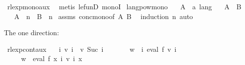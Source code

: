 \begin{isabellebody}
\ rlexp{\isacharunderscore}{\kern0pt}mono{\isacharunderscore}{\kern0pt}aux\ \isamarkupfalse%
\ {\isacharparenleft}{\kern0pt}metis\ le{\isacharunderscore}{\kern0pt}funD\ monoI{\isacharparenright}{\kern0pt}%
\endisatagproof
{\isafoldproof}%
%
\isadelimproof
%
\endisadelimproof
%
\isadelimdocument
%
\endisadelimdocument
%
\isatagdocument
%
\isamarkuptrue%
%
\endisatagdocument
{\isafolddocument}%
%
\isadelimdocument
%
\endisadelimdocument
{}\isamarkupfalse%
\ langpow{\isacharunderscore}{\kern0pt}mono{\isacharcolon}{\kern0pt}\isanewline
\ \ \ A\ {\isacharcolon}{\kern0pt}{\isacharcolon}{\kern0pt}\ {\isachardoublequoteopen}{\isacharprime}{\kern0pt}a\ lang{\isachardoublequoteclose}\isanewline
\ \ \ {\isachardoublequoteopen}A\ {\isasymsubseteq}\ B{\isachardoublequoteclose}\isanewline
\ \ \ {\isachardoublequoteopen}A\ {\isacharcircum}{\kern0pt}{\isacharcircum}{\kern0pt}\ n\ {\isasymsubseteq}\ B\ {\isacharcircum}{\kern0pt}{\isacharcircum}{\kern0pt}\ n{\isachardoublequoteclose}\isanewline
%
\isadelimproof
%
\endisadelimproof
%
\isatagproof
{}\isamarkupfalse%
\ assms\ conc{\isacharunderscore}{\kern0pt}mono{\isacharbrackleft}{\kern0pt}of\ A\ B{\isacharbrackright}{\kern0pt}\ \isamarkupfalse%
\ {\isacharparenleft}{\kern0pt}induction\ n{\isacharparenright}{\kern0pt}\ auto%
\endisatagproof
{\isafoldproof}%
%
\isadelimproof
%
\endisadelimproof
%
\begin{isamarkuptext}%
The one direction:%
\end{isamarkuptext}\isamarkuptrue%
\isamarkupfalse%
\ rlexp{\isacharunderscore}{\kern0pt}cont{\isacharunderscore}{\kern0pt}aux{}{\isacharcolon}{\kern0pt}\isanewline
\ \ \ {\isachardoublequoteopen}{\isasymforall}i{\isachardot}{\kern0pt}\ v\ i\ {\isasymle}\ v\ {\isacharparenleft}{\kern0pt}Suc\ i{\isacharparenright}{\kern0pt}{\isachardoublequoteclose}\isanewline
\ \ \ \ \ \ \ {\isachardoublequoteopen}w\ {\isasymin}\ {\isacharparenleft}{\kern0pt}{\isasymUnion}i{\isachardot}{\kern0pt}\ eval\ f\ {\isacharparenleft}{\kern0pt}v\ i{\isacharparenright}{\kern0pt}{\isacharparenright}{\kern0pt}{\isachardoublequoteclose}\isanewline
\ \ \ \ \ {\isachardoublequoteopen}w\ {\isasymin}\ eval\ f\ {\isacharparenleft}{\kern0pt}{\isasymlambda}x{\isachardot}{\kern0pt}\ {\isasymUnion}i{\isachardot}{\kern0pt}\ v\ i\ x{\isacharparenright}{\kern0pt}{\isachardoublequoteclose}\isanewline

\end{isabellebody}
